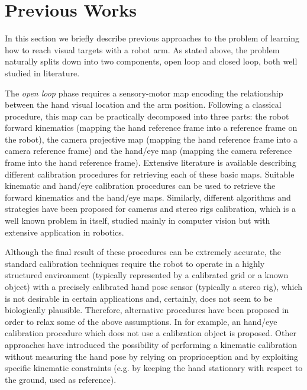 \section{Previous Works}



In this section we briefly describe previous approaches to the problem of 
learning how to reach visual targets with a robot arm. As stated above, the problem 
naturally splits down into two components, open loop and closed loop, both well 
studied in literature.

The {\em open loop} phase requires a sensory-motor map encoding the relationship between the hand visual location and the arm position. Following a classical procedure, this map can be practically decomposed into three parts: the robot forward kinematics (mapping the hand reference frame into a reference frame on the robot), the camera projective map (mapping the hand reference frame into a camera reference frame) and the hand/eye map (mapping the camera reference frame into the hand reference frame). Extensive literature is available describing different calibration procedures for retrieving each of these basic maps. Suitable kinematic \cite{Hollerbach96calibration} and hand/eye \cite{Tsai88calibration} calibration procedures can be used to retrieve the forward kinematics and the hand/eye maps. Similarly, different algorithms and strategies have been proposed for cameras and stereo rigs calibration, which is a well known problem in itself, studied mainly in computer vision \cite{Soatto03vision} but with extensive application in robotics. 

Although the final result of these procedures can be extremely accurate, the standard calibration techniques require the robot to operate in a highly structured environment (typically represented by a calibrated grid or a known object) with a precisely calibrated hand pose sensor (typically a stereo rig), which is not desirable in certain applications and, certainly, does not seem to be biologically plausible. Therefore, alternative procedures have been proposed in order to relax some of the above assumptions. In \cite{AHE01} for example, an hand/eye calibration procedure which does not use a calibration object is proposed. Other approaches have introduced the possibility of performing a kinematic calibration without measuring the hand pose \cite{Bennett91calibration} by relying on proprioception and by exploiting specific kinematic constraints (e.g. by keeping the hand stationary with respect to the ground, used as reference).

